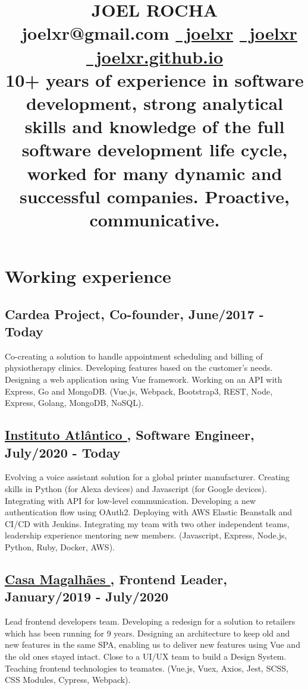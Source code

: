 \documentclass[10pt,a4paper]{article}
\title{
    \color{head} \huge \uppercase{Joel Rocha} \\
    \color{head} \vspace{0.2cm} \small \faEnvelopeO \ joelxr@gmail.com \href{https://github.com/joelxr}{\faGithub \ joelxr}
    \href{https://www.linkedin.com/in/joelxr}{\faLinkedin \ joelxr}
    \href{https://joelxr.github.io/}{\faGlobe \ joelxr.github.io}
    \\
    \color{black} \vspace{0.2cm} \small 10+ years of experience in software development, strong analytical skills and knowledge of the full software development life cycle, worked for many dynamic and successful companies. Proactive, communicative.
    \vspace{0.4cm} \hline
    \vspace{-0.8cm}
}
\author{}
\date{}
\begin{document}
\maketitle
\section*{Working experience}
\subsection*{Cardea Project, Co-founder, June/2017 - Today}

Co-creating a solution to handle appointment scheduling and billing of physiotherapy clinics. Developing features based on the customer's needs. Designing a web application using Vue framework. Working on an API with Express, Go and MongoDB. (Vue.js, Webpack, Bootstrap3, REST, Node, Express, Golang, MongoDB, NoSQL).

\subsection*{\href{www.atlantico.com.br}{\uline{Instituto Atlântico \faExternalLink}}, Software Engineer, July/2020 - Today}

Evolving a voice assistant solution for a global printer manufacturer. Creating skills in Python (for Alexa devices) and Javascript (for Google devices). Integrating with API for low-level communication. Developing a new authentication flow using OAuth2. Deploying with AWS Elastic Beanstalk and CI/CD with Jenkins. Integrating  my team with two other independent teams, leadership experience mentoring new members. (Javascript, Express, Node.js, Python, Ruby, Docker, AWS).

\subsection*{\href{www.casamagalhaes.com.br}{\uline{Casa Magalhães \faExternalLink}}, Frontend Leader, January/2019 - July/2020}

Lead frontend developers team. Developing a redesign for a solution to retailers which has been running for 9 years. Designing an architecture to keep old and new features in the same SPA, enabling us to deliver new features using Vue and the old ones stayed intact. Close to a UI/UX team to build a Design System. Teaching frontend technologies to teamates. (Vue.js, Vuex, Axios, Jest, SCSS, CSS Modules, Cypress, Webpack).
\end{document}
